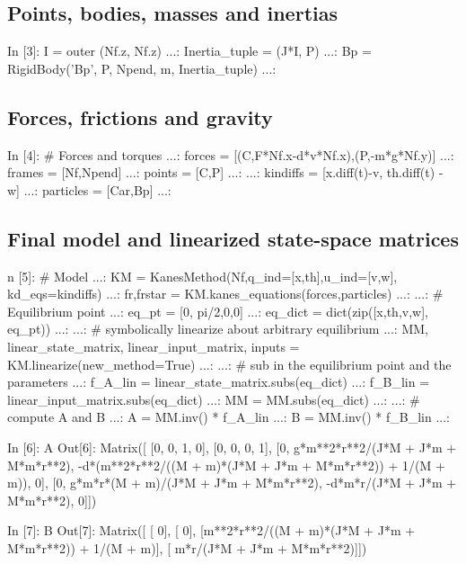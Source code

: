 \subsection{Points, bodies, masses and inertias}
\begin{code}
In [3]: I = outer (Nf.z, Nf.z)
   ...: Inertia_tuple = (J*I, P)
   ...: Bp = RigidBody('Bp', P, Npend, m, Inertia_tuple)
   ...: 
\end{code}

\subsection{Forces, frictions and gravity}
\begin{code}
In [4]: # Forces and torques
   ...: forces = [(C,F*Nf.x-d*v*Nf.x),(P,-m*g*Nf.y)]
   ...: frames = [Nf,Npend]
   ...: points = [C,P]
   ...: 
   ...: kindiffs = [x.diff(t)-v, th.diff(t) - w]
   ...: particles = [Car,Bp]
   ...: 
\end{code}

\subsection{Final model and linearized state-space matrices}
\begin{code}
n [5]: # Model
   ...: KM = KanesMethod(Nf,q_ind=[x,th],u_ind=[v,w], kd_eqs=kindiffs)
   ...: fr,frstar = KM.kanes_equations(forces,particles)
   ...: 
   ...: # Equilibrium point
   ...: eq_pt = [0, pi/2,0,0]
   ...: eq_dict = dict(zip([x,th,v,w], eq_pt))
   ...: 
   ...: # symbolically linearize about arbitrary equilibrium
   ...: MM, linear_state_matrix, linear_input_matrix, inputs = 
KM.linearize(new_method=True)
   ...: 
   ...: # sub in the equilibrium point and the parameters
   ...: f_A_lin = linear_state_matrix.subs(eq_dict)
   ...: f_B_lin = linear_input_matrix.subs(eq_dict)
   ...: MM = MM.subs(eq_dict)
   ...: 
   ...: # compute A and B
   ...: A = MM.inv() * f_A_lin
   ...: B = MM.inv() * f_B_lin
   ...: 
\end{code}

\begin{code}
In [6]: A
Out[6]: 
Matrix([
[0,  0,  1, 0],
[0,  0,  0, 1],
[0,   g*m**2*r**2/(J*M + J*m + M*m*r**2), -d*(m**2*r**2/((M + m)*(J*M + J*m 
+ M*m*r**2)) + 1/(M + m)), 0],
[0, g*m*r*(M + m)/(J*M + J*m + M*m*r**2),                               
-d*m*r/(J*M + J*m + M*m*r**2), 0]])
\end{code}

\begin{code}
In [7]: B
Out[7]: 
Matrix([
[                                                       0],
[                                                       0],
[m**2*r**2/((M + m)*(J*M + J*m + M*m*r**2)) + 1/(M + m)],
[                            m*r/(J*M + J*m + M*m*r**2)]])
\end{code}

